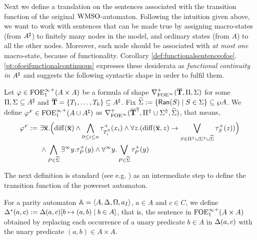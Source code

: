 Next we define a translation on the sentences associated with the transition 
function of the original $\mathrm{WMSO}$-automaton.
Following the intuition given above, we want to work with sentences that can be
made true by assigning macro-states (from $A^{\sharp}$) to finitely many nodes in the
model, and ordinary states (from $A$) to all the other nodes. 
Moreover, each node should be associated with \emph{at most one} macro-state, 
because of functionality. 
Corollary \ref{def:functionalsentenceofoe}.\ref{pt:ofoeifunctionalcontinuous} 
expresses these desiderata as \emph{functional continuity in $A^{\sharp}$} and 
suggests the following syntactic shape in order to fulfil them.

\begin{definition}\label{DEF_finitary_lifting}
Let $\varphi \in {\ensuremath{\mathrm{FOE}^{\infty}_1}}^+(A \times A)$ be a formula of shape $\nabla^+_{\mathrm{FOE}^{\infty}}(\overline{{\mathbf{T}}},\Pi,\Sigma)$ for some $\Pi,\Sigma \subseteq A^{\sharp}$ and $\overline{{\mathbf{T}}} = \{T_1,\dots,T_k\} \subseteq A^{\sharp}$. Fix $\widetilde{\Sigma} \mathrel{: =} \{\mathsf{Ran}(S) \mid S \in \Sigma\} \subseteq \wp A$. We define $\varphi^{{\scriptscriptstyle F}} \in {\ensuremath{\mathrm{FOE}^{\infty}_1}}^+(A \cup A^{\sharp})$ as $\nabla^+_{\mathrm{FOE}^{\infty}}(\overline{{\mathbf{T}}}^{\Uparrow},\Pi^{\Uparrow} \cup \Sigma^{\Uparrow},\widetilde{\Sigma})$, that means,
\begin{equation}\label{eq:unfoldingNablaolque}
\begin{aligned}
\varphi^{\fin} \df\ &
    \exists \vlist{x}.\Big(\arediff{\vlist{x}} 
      \land \bigwedge_{0 \leq i \leq n} \tau^+_{\lift{T}_i}(x_i)
\land
    \forall z.(\arediff{\vlist{x},z} \lthen 
    \bigvee_{S\in \lift{\Pi} \cup \lift{\Sigma} \cup \widetilde{\Sigma}} 
       \tau^+_S(z))\Big)
\\ & 
    \land \bigwedge_{P\in\widetilde{\Sigma}} \qu y.{\tau}^{+}_P(y)
 \land
    \dqu y.\bigvee_{P\in\widetilde{\Sigma}} {\tau}^{+}_P(y)
    \end{aligned}
\end{equation}
\end{definition}

The next definition is standard (see e.g.  \cite{Walukiewicz96,Ven08}) as an 
intermediate step to define the transition function of the powerset automaton.

\begin{definition}\label{DEF_delta star} For a parity automaton $\mathbb{A} = \langle{A,\Delta,\Omega,a_I}\rangle$, $a \in A$ and $c \in C$, we define $\Delta^{*}(a,c) \mathrel{: =} \Delta(a,c)[b \mapsto (a,b) \mid b \in A]$, that is, the sentence in ${\mathrm{FOE}^{\infty}_1}^+(A\times A)$ obtained by replacing each occurrence of a unary predicate $b \in A$ in $\Delta(a,c)$ with the unary predicate $(a,b) \in A \times A$. \end{definition}

